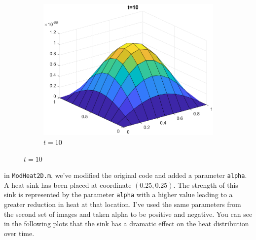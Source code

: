 \documentclass[]{article}
\def\incode#1{\texttt{#1}}
\begin{document}
	\begin{figure}[htbp]
		\centering	
		\begin{subfigure}[b]{0.45\textwidth}
			\includegraphics[width=\textwidth]{images/h2_t6.eps}
			\caption{$t = 10$}
			\label{fig:image5}
		\end{subfigure}
	\end{figure}
	\newpage
	in \incode{ModHeat2D.m}, we've modified the original code and added a parameter \incode{alpha}. A heat sink has been placed at coordinate $(0.25, 0.25)$. The strength of this sink is represented by the parameter \incode{alpha} with a higher value leading to a greater reduction in heat at that location. I've used the same parameters from the second set of images and taken alpha to be positive and negative. You can see in the following plots that the sink has a dramatic effect on the heat distribution over time. 
	
\end{document}
